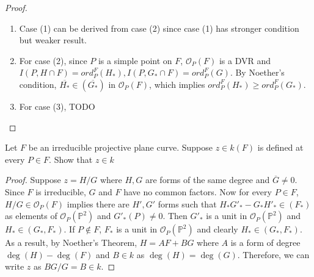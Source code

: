 \documentclass{solution}
\newcommand{\TODO}{{\color{red} TODO}}
\begin{document}
\begin{proof}
    \begin{enumerate}
        \item Case (1) can be derived from case (2) since case (1) has stronger condition but weaker result.
        \item For case (2), since $P$ is a simple point on $F$, $\mathcal{O}_{P}(F)$ is a DVR and $I(P, H \cap F) = ord_P^F(H_*), I(P, G_* \cap F) = ord_P^F(G)$. By Noether's condition, $\overline{H_*} \in (\overline{G_*})$ in $\mathcal{O}_{P}(F)$, which implies $ord_P^F (H_*) \ge ord_P^F(G_*)$.
        \item For case (3), \TODO
    \end{enumerate}
\end{proof}

\begin{problem}{5.30}
    Let $F$ be an irreducible projective plane curve. Suppose $z \in k(F)$ is defined at every $P \in F$. Show that $z \in k$
\end{problem}

\begin{proof}
    Suppose $z = H / G$ where $H, G$ are forms of the same degree and $\overline{G} \ne 0$. Since $F$ is irreducible, $G$ and $F$ have no common factors. Now for every $P \in F$, $H / G \in \mathcal{O}_{P}(F)$ implies there are $H', G'$ forms such that $H_*G'_* - G_*H'_* \in (F_*)$ as elements of $\mathcal{O}_{P}(\mathbb{P}^2)$ and $G'_*(P) \ne 0$. Then $G'_*$ is a unit in $\mathcal{O}_{P}(\mathbb{P}^2)$ and $H_* \in (G_*, F_*)$. If $P \notin F$, $F_*$ is a unit in $\mathcal{O}_{P}(\mathbb{P}^2)$ and clearly $H_* \in (G_*, F_*)$. As a result, by Noether's Theorem, $H = AF + BG$ where $A$ is a form of degree $\deg(H) - \deg(F)$ and $B \in k$ as $\deg(H) = \deg(G)$. Therefore, we can write $z$ as $BG / G = B \in k$.
\end{proof}
\end{document}
